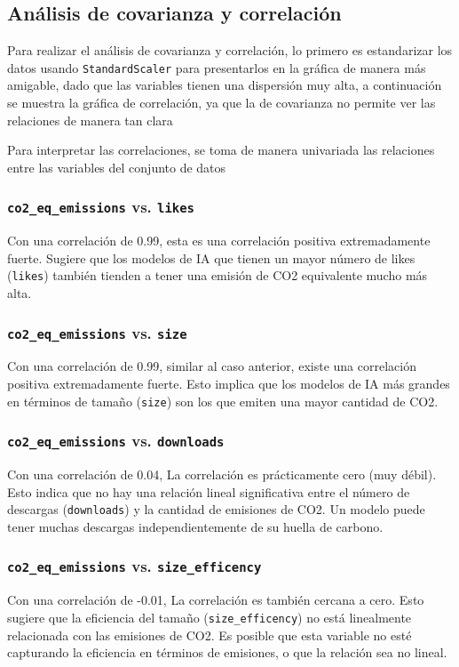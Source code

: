 \documentclass[journal]{IEEEtran}
\begin{document}
	\subsection{Análisis de covarianza y correlación}
	Para realizar el análisis de covarianza y correlación, lo primero es estandarizar los datos usando \texttt{StandardScaler} para presentarlos en la gráfica de manera más amigable, dado que las variables tienen una dispersión muy alta, a continuación se muestra la gráfica de correlación, ya que la de covarianza no permite ver las relaciones de manera tan clara


	Para interpretar las correlaciones, se toma de manera univariada las relaciones entre las variables del conjunto de datos
	\subsubsection{\texttt{co2\_eq\_emissions} vs. \texttt{likes}}

	Con una correlación de 0.99, esta es una correlación positiva extremadamente fuerte. Sugiere que los modelos de IA que tienen un mayor número de likes
	(\texttt{likes}) también tienden a tener una emisión de CO2 equivalente mucho más alta.
	\subsubsection{\texttt{co2\_eq\_emissions} vs. \texttt{size}}
	Con una correlación de 0.99, similar al caso anterior, existe una correlación positiva extremadamente fuerte. Esto implica que los modelos de IA más grandes en términos de tamaño (\texttt{size}) son los que emiten una mayor cantidad de CO2.

	\subsubsection{\texttt{co2\_eq\_emissions} vs. \texttt{downloads}}
	Con una correlación de 0.04, La correlación es prácticamente cero (muy débil). Esto indica que no hay una relación lineal significativa entre el número de descargas (\texttt{downloads}) y la cantidad de emisiones de CO2. Un modelo puede tener muchas descargas independientemente de su huella de carbono.

	\subsubsection{\texttt{co2\_eq\_emissions} vs. \texttt{size\_efficency}}
	Con una correlación de -0.01, La correlación es también cercana a cero. Esto sugiere que la eficiencia del tamaño (\texttt{size\_efficency}) no está linealmente relacionada con las emisiones de CO2. Es posible que esta variable no esté capturando la eficiencia en términos de emisiones, o que la relación sea no lineal.
\end{document}
